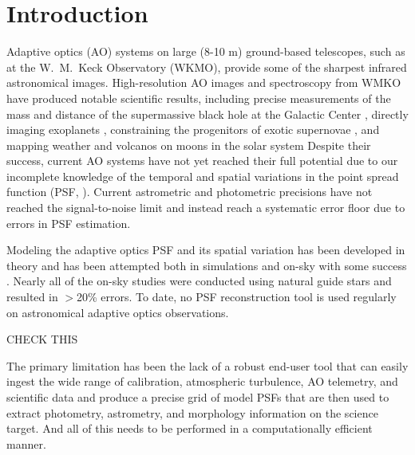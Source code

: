 \section{Introduction}

Adaptive optics (AO) systems on large (8-10 m)
ground-based telescopes, such as at the W.~M.~Keck Observatory (WKMO),
provide some of the sharpest infrared astronomical images. 
High-resolution AO images and spectroscopy from WMKO have produced 
notable scientific results, including precise measurements of the mass
and distance of the supermassive black hole at the Galactic Center
\cite{Ghez:2008,Meyer:2012}, 
directly imaging exoplanets \cite{Marois:2008,Marois:2010},
constraining the progenitors of exotic supernovae
\cite{Smith:2007,GalYam:2007},
and mapping weather and volcanos on moons in the solar system
\cite{Roe:2002,Marchis:2005}
Despite their success, current AO systems have not yet reached their
full potential due to our incomplete knowledge of the temporal and
spatial variations in the point spread function (PSF,
\cite{Davies:2012,Lu:2014}). 
Current astrometric and photometric precisions have not reached 
the signal-to-noise limit and instead reach a systematic error floor
due to errors in PSF estimation.

Modeling the adaptive optics PSF and its spatial variation has
been developed in theory 
\cite{Veran:1996,Flicker:2003,Steinbring:2003,Steinbring:2005,Gendron:2006} 
and has been attempted both in simulations and on-sky with some success 
\cite{Harder:1998,Harder:1999,Jolissaint:2004,Aubailly:2005,Britton:2006,Clenet:2008,Martin:2016}.
Nearly all of the on-sky studies were conducted using natural guide
stars and resulted in $>$20\% errors. To date, no PSF reconstruction tool is
used regularly on astronomical adaptive optics observations.
\begin{notes}
CHECK THIS
\end{notes}
The primary limitation has been the lack of a robust end-user tool
that can easily ingest the wide range of calibration, atmospheric
turbulence, AO telemetry, and scientific data and produce a precise grid
of model PSFs that are then used to extract photometry, astrometry,
and morphology information on the science target. And all of this
needs to be performed in a computationally efficient manner.






